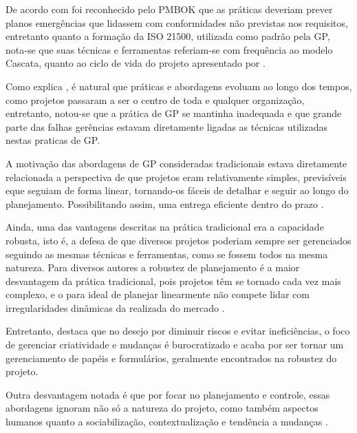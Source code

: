 De acordo com  foi reconhecido pelo PMBOK que as práticas deveriam prever planos emergências que lidassem com conformidades não previstas nos requisitos, entretanto quanto a formação da ISO 21500, utilizada como padrão pela GP, nota-se que suas técnicas e ferramentas referiam-se com frequência ao modelo Cascata, quanto ao ciclo de vida do projeto apresentado por .

Como explica , é natural que práticas e abordagens evoluam ao longo dos tempos, como projetos passaram a ser o centro de toda e qualquer organização, entretanto, notou-se que a prática de GP se mantinha inadequada e que grande parte das falhas gerências estavam diretamente ligadas as técnicas utilizadas nestas praticas de GP.

A motivação das abordagens de GP consideradas tradicionais estava diretamente relacionada a perspectiva de que projetos eram relativamente simples, previsíveis eque seguiam de forma linear, tornando-os fáceis de detalhar e seguir ao longo do planejamento. Possibilitando assim, uma entrega eficiente dentro do prazo \cite{turner2010perspectives, boehm1988spiral, boehm2003using, cicmil2009exploring, collyer2010aim, mir2014exploring, shenhar2007reinventing, williams2005assessing}.

Ainda, uma das vantagens descritas na prática tradicional era a capacidade robusta, isto é, a defesa de que diversos projetos poderiam sempre ser gerenciados seguindo as mesmas técnicas e ferramentas, como se fossem todos na mesma natureza. Para diversos autores a robustez de planejamento é a maior desvantagem da prática tradicional, pois projetos têm se tornado cada vez mais complexo, e o para ideal de planejar linearmente não compete lidar com irregularidades dinâmicas da realizada do mercado \cite{aguanno2004101, cicmil2009exploring, chin2004agile, shenhar2007reinventing, williams2005assessing, wysocki2011effective}.

Entretanto,  destaca que no desejo por diminuir riscos e evitar ineficiências, o foco de gerenciar criatividade e mudanças é burocratizado e acaba por ser tornar um gerenciamento de papéis e formulários, geralmente encontrados na robustez do projeto.

Outra desvantagem notada é que por focar no planejamento e controle, essas abordagens ignoram não só a natureza do projeto, como também aspectos humanos quanto a sociabilização, contextualização e tendência a mudanças \cite{winter2006directions, highsmith2009agile}.


